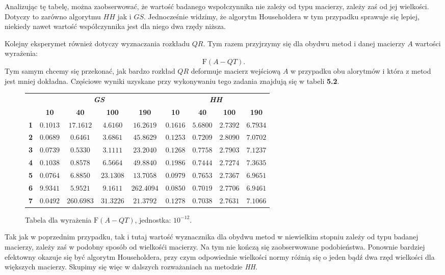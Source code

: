 Analizując tę tabelę, można zaobserwować, że wartość badanego wspołczynnika nie zależy od typu macierzy, zależy
zaś od jej wielkości. Dotyczy to zarówno algorytmu $HH$ jak i $GS$. Jednocześnie widzimy, że algorytm Householdera
w tym przypadku sprawuje się lepiej, niekiedy nawet wartość współczynnika jest dla niego dwa rzędy niższa. 

Kolejny eksperymet również dotyczy wyznaczania rozkładu $QR$. Tym razem przyjrzymy się dla obydwu metod
i danej macierzy $A$ wartości wyrażenia:
$$\mathrm{F}(A-QT).$$
Tym samym chcemy się przekonać, jak bardzo rozkład $QR$ deformuje macierz wejściową $A$ w przypadku obu alorytmów
i która z metod jest mniej dokładna. Częściowe wyniki uzyskane przy wykonywaniu tego zadania znajdują się w tabeli
\textbf{5.2}.
\begin{figure}[h!tb]
\begin{center}
\begin{tabular}{|l||c|c|c|c||c|c|c|c|}
\hline
\multirow{2}{*}{} & \multicolumn{4}{|c||}{\textbf{\textit{GS}}} & \multicolumn{4}{|c|}{\textbf{\textit{HH}}}\\
\cline{2-9}
&\textbf{10} & \textbf{40} & \textbf{100} & \textbf{190} & \textbf{10} & \textbf{40} & \textbf{100} & \textbf{190} \\
\hline
\hline
\textbf{1} & $0.1013$ & $17.1612$ & $4.6160$ & $16.2619$ & $0.1616$ & $5.6800$ & $2.7392$ & $6.7934$ \\
\hline
\textbf{2} & $0.0689$ & $0.6461$ & $3.6861$ & $45.8629$ & $0.1253$ & $0.7209$ & $ 2.8090$ & $7.0702$ \\
\hline
\textbf{3} & $0.0739$ & $0.5330$ & $3.1111$ & $23.2040$ & $0.1268$ & $0.7758$ & $2.7903$ & $7.1237$ \\
\hline
\textbf{4} & $0.1038$ & $0.8578$ & $6.5664$ & $49.8840$ & $0.1986$ & $0.7444$ & $2.7274$ & $7.3635$ \\
\hline
\textbf{5} & $0.0764$ & $6.8850$ & $23.1308$ & $13.7058$ & $0.0979$ & $0.7653$ & $2.7367$ & $6.9651$ \\
\hline
\textbf{6} & $9.9341$ & $5.9521$ & $9.1611$ & $262.4094$ & $0.0850$ & $0.7019$ & $2.7706$ & $6.9461$ \\
\hline
\textbf{7} & $0.0492$ & $260.6983$ & $31.3226$ & $21.3792$ & $0.1278$ & $0.7038$ & $2.7631$ & $7.1066$ \\
\hline
\end{tabular}
\caption{Tabela dla wyrażenia $\mathrm{F}(A-QT)$, jednostka: $10^{-12}$.} 
\end{center}
\end{figure}
Tak jak w poprzednim przypadku, tak i tutaj wartość wyznacznika dla obydwu metod w niewielkim stopniu
zależy od typu badanej macierzy, zależy zaś w podobny sposób od wielkośći macierzy. Na tym nie kończą
się zaobserwowane podobieństwa. Ponownie bardziej efektowny okazuje się być algorytm Householdera, przy
czym odpowiednie wielkości normy różnią się o jeden bądź dwa rzęd wielkości dla większych macierzy. Skupimy
się więc w dalszych rozważaniach na metodzie \textit{HH}.

